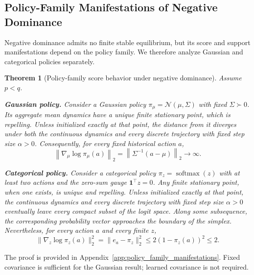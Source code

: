 \documentclass{article}
\theoremstyle{plain}
\newtheorem{theorem}{Theorem}[section]
\theoremstyle{definition}
\theoremstyle{remark}
\begin{document}
\subsection{Policy-Family Manifestations of Negative Dominance}
\label{sec:policy_family_manifestations}

Negative dominance admits no finite stable equilibrium, but its score
and support manifestations depend on the policy family. We therefore
analyze Gaussian and categorical policies separately.

\begin{theorem}[Policy-family score behavior under negative dominance]
\label{thm:policy_family_manifestations}
Assume \(p<q\).

\textbf{Gaussian policy.}
Consider a Gaussian policy
\(\pi_\mu=\mathcal N(\mu,\Sigma)\) with fixed
\(\Sigma\succ0\). Its aggregate mean dynamics have a unique finite
stationary point, which is repelling. Unless initialized exactly at that
point, the distance from it diverges under both the continuous dynamics
and every discrete trajectory with fixed step size \(\alpha>0\).
Consequently, for every fixed historical action \(a\),
\begin{equation}
    \left\|
        \nabla_\mu\log\pi_\mu(a)
    \right\|_2
    =
    \left\|
        \Sigma^{-1}(a-\mu)
    \right\|_2
    \longrightarrow
    \infty.
    \label{eq:gaussian_unbounded_score}
\end{equation}

\textbf{Categorical policy.}
Consider a categorical policy
\(\pi_z=\operatorname{softmax}(z)\) with at least two actions and the
zero-sum gauge \(\mathbf 1^\top z=0\). Any finite stationary point, when
one exists, is unique and repelling. Unless initialized exactly at that
point, the continuous dynamics and every discrete trajectory with fixed
step size \(\alpha>0\) eventually leave every compact subset of the
logit space. Along some subsequence, the corresponding probability
vector approaches the boundary of the simplex. Nevertheless, for every
action \(a\) and every finite \(z\),
\begin{equation}
\|\nabla_z\log\pi_z(a)\|_2^2
=
\|e_a-\pi_z\|_2^2
\le 2(1-\pi_z(a))^2
\le 2.
\label{eq:categorical_bounded_score}
\end{equation}
\end{theorem}

The proof is provided in
Appendix~\ref{app:policy_family_manifestations}.
Fixed covariance is sufficient for the Gaussian result; learned covariance is
not required.
\end{document}

